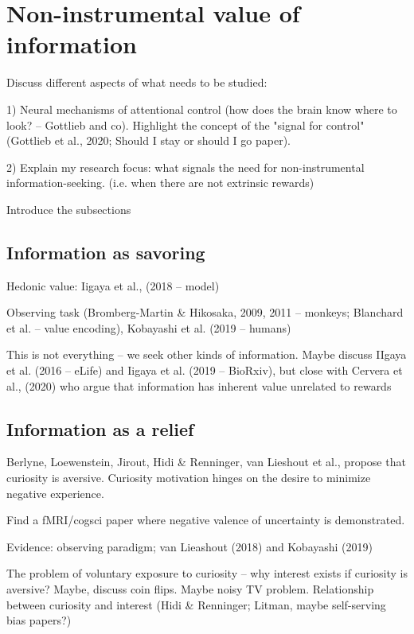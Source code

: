 
\section{Non-instrumental value of information}

    Discuss different aspects of what needs to be studied: 
    
    1) Neural mechanisms of attentional control (how does the brain know where to look? -- Gottlieb and co). Highlight the concept of the "signal for control" (Gottlieb et al., 2020; Should I stay or should I go paper).

    2) Explain my research focus: what signals the need for non-instrumental information-seeking. (i.e. when there are not extrinsic rewards)

    Introduce the subsections

    \subsection{Information as savoring}

        Hedonic value: Iigaya et al., (2018 -- model) 
            
        Observing task (Bromberg-Martin & Hikosaka, 2009, 2011 -- monkeys; Blanchard et al. -- value encoding), Kobayashi et al. (2019 -- humans)

        This is not everything -- we seek other kinds of information. Maybe discuss IIgaya et al. (2016 -- eLife) and Iigaya et al. (2019 -- BioRxiv), but close with Cervera et al., (2020) who argue that information has inherent value unrelated to rewards

    \subsection{Information as a relief}

        Berlyne, Loewenstein, Jirout, Hidi & Renninger, van Lieshout et al., propose that curiosity is aversive. Curiosity motivation hinges on the desire to minimize negative experience.

        Find a fMRI/cogsci paper where negative valence of uncertainty is demonstrated.

        Evidence: observing paradigm; van Lieashout (2018) and Kobayashi (2019)

        The problem of voluntary exposure to curiosity -- why interest exists if curiosity is aversive? Maybe, discuss coin flips. Maybe noisy TV problem. Relationship between curiosity and interest (Hidi & Renninger; Litman, maybe self-serving bias papers?)

